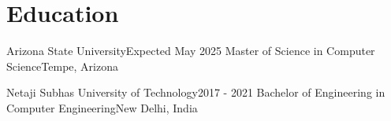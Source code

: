 \section{Education}
    \resumeSubHeadingListStart

    \resumeSubheading
    {Arizona State University}{Expected May 2025\textit{}}
    {Master of Science in Computer Science}{Tempe, Arizona}
    \resumeItemListStart
    \resumeItemListEnd

    \resumeSubheading
    {Netaji Subhas University of Technology}{2017 - 2021}
    {Bachelor of Engineering in Computer Engineering}{New Delhi, India}
    \resumeSubHeadingListEnd